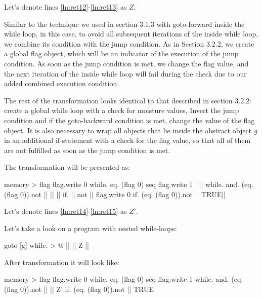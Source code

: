\documentclass[sigplan,review,11pt,nonacm,natbib=false]{acmart}
\begin{document}
Let's denote lines \ref{ln:ret12}-\ref{ln:ret13} as $Z$.

Similar to the technique we used in section 3.1.3 with goto-forward inside the while loop, in this case, to avoid all subsequent iterations of the inside while loop, we combine its condition with the jump condition. As in Section 3.2.2, we create a global flag object, which will be an indicator of the execution of the jump condition. As soon as the jump condition is met, we change the flag value, and the next iteration of the inside while loop will fail during the check due to our added combined execution condition.

The rest of the transformation looks identical to that described in section 3.2.2: create a global while loop with a check for moisture values, Invert the jump condition and if the goto-backward condition is met, change the value of the flag object.
It is also necessary to wrap all objects that lie inside the abstract object \emph{g} in an additional if-statement with a check for the flag value, so that all of them are not fulfilled as soon as the jump condition is met.

The transformation will be presented as:

\begin{ffcode}

memory > flag
flag.write 0
while.
  eq. (flag 0)
  seq
    flag.write 1
    |||$\label{ln:ret14}$|
      while.
        and.
          (eq. (flag 0)).not
          ||
        ||
          ||
          if.
            ||.not
            ||
            flag.write 0
          if.
            (eq. (flag 0)).not
            ||
            TRUE|$\label{ln:ret15}$|
        
\end{ffcode}

Let's denote lines \ref{ln:ret14}-\ref{ln:ret15} as $Z'$.


Let's take a look on a program with nested while-loops:
\begin{ffcode}

goto
  [g]
    while. > @
      ||
      ||
        Z
        ||

\end{ffcode}

After transformation it will look like:
\begin{ffcode}

memory > flag
flag.write 0
while.
  eq. (flag 0)
  seq
    flag.write 1
    while.
      and.
        (eq. (flag 0)).not
        ||
      ||
        Z'
        if.
          (eq. (flag 0)).not
          ||
          TRUE

\end{ffcode}
\end{document}
